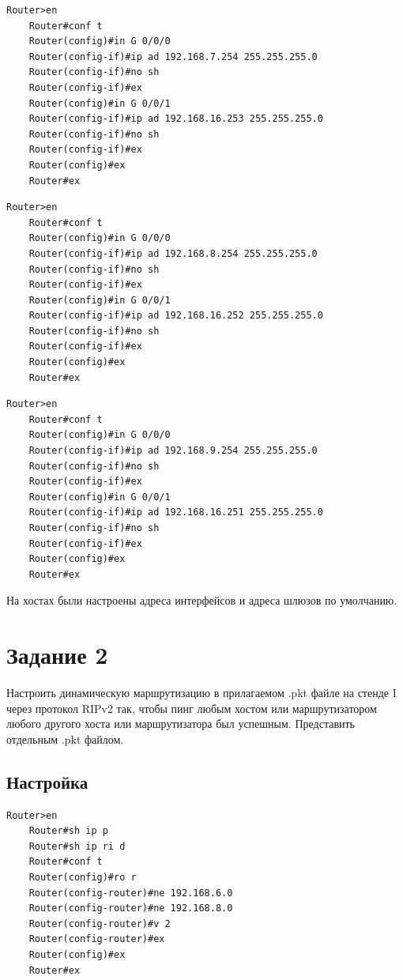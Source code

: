 \documentclass[a4paper,oneside,12pt]{extreport}
\begin{document}
\begin{lstlisting}[gobble=8, caption=Настройка маршрутизатора Router8]
	Router>en
	Router#conf t
	Router(config)#in G 0/0/0
	Router(config-if)#ip ad 192.168.7.254 255.255.255.0
	Router(config-if)#no sh
	Router(config-if)#ex
	Router(config)#in G 0/0/1
	Router(config-if)#ip ad 192.168.16.253 255.255.255.0
	Router(config-if)#no sh
	Router(config-if)#ex
	Router(config)#ex
	Router#ex
\end{lstlisting}

\begin{lstlisting}[gobble=8, caption=Настройка маршрутизатора Router9]
	Router>en
	Router#conf t
	Router(config)#in G 0/0/0
	Router(config-if)#ip ad 192.168.8.254 255.255.255.0
	Router(config-if)#no sh
	Router(config-if)#ex
	Router(config)#in G 0/0/1
	Router(config-if)#ip ad 192.168.16.252 255.255.255.0
	Router(config-if)#no sh
	Router(config-if)#ex
	Router(config)#ex
	Router#ex
\end{lstlisting}

\begin{lstlisting}[gobble=8, caption=Настройка маршрутизатора Router10]
	Router>en
	Router#conf t
	Router(config)#in G 0/0/0
	Router(config-if)#ip ad 192.168.9.254 255.255.255.0
	Router(config-if)#no sh
	Router(config-if)#ex
	Router(config)#in G 0/0/1
	Router(config-if)#ip ad 192.168.16.251 255.255.255.0
	Router(config-if)#no sh
	Router(config-if)#ex
	Router(config)#ex
	Router#ex
\end{lstlisting}

На хостах были настроены адреса интерфейсов и адреса шлюзов по умолчанию.

\chapter{Задание 2}

Настроить динамическую маршрутизацию в прилагаемом .pkt файле на стенде I через протокол RIPv2 так, чтобы пинг любым хостом или маршрутизатором любого другого хоста или маршрутизатора был успешным.
Представить отдельным .pkt файлом.

\section{Настройка}

\begin{lstlisting}[gobble=8, caption=Настройка маршрутизатора Router0]
	Router>en
	Router#sh ip p
	Router#sh ip ri d
	Router#conf t
	Router(config)#ro r
	Router(config-router)#ne 192.168.6.0
	Router(config-router)#ne 192.168.8.0
	Router(config-router)#v 2
	Router(config-router)#ex
	Router(config)#ex
	Router#ex
\end{lstlisting}
\end{document}
